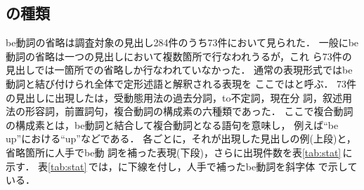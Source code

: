 \subsection{\protect\KEY の種類}
\label{sec:investigation:key}

be動詞の省略は調査対象の見出し284件のうち73件において見られた．
一般にbe動詞の省略は一つの見出しにおいて複数箇所で行なわれうるが，これ
ら73件の見出しでは一箇所での省略しか行なわれていなかった．
通常の表現形式ではbe動詞と結び付けられ全体で定形述語と解釈される表現を
ここでは\KEY と呼ぶ．
73件の見出しに出現した\KEY は，受動態用法の過去分詞，to不定詞，現在分
詞，叙述用法の形容詞，前置詞句，複合動詞の構成素の六種類であった．
ここで複合動詞の構成素とは，be動詞と結合して複合動詞となる語句を意味し， 
例えば``be up''における``up''などである．
各\KEY ごとに，それが出現した見出しの例(上段)と，省略箇所に人手でbe動
詞を補った表現(下段)，さらに出現件数を表\ref{tab:stat}\,に示す． 
表\ref{tab:stat}\,では，\KEY に下線を付し，人手で補ったbe動詞を斜字体
で示している．
